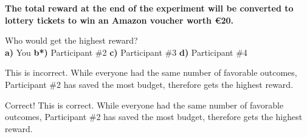 \textbf{The total reward at the end of the experiment will be converted to lottery tickets to win an Amazon  voucher worth €20.}

\begin{table}[H]
    \centering
    \label{tab:q10}
\end{table}

Who would get the highest reward? \\
\indent \textbf{a)} You \indent \indent \textbf{b*)} Participant \#2
\indent \indent \textbf{c)} Participant \#3
\indent \indent \textbf{d)} Participant \#4

 This is incorrect. While everyone had the same number of favorable outcomes, Participant \#2 has saved the most budget, therefore gets the highest reward.

 Correct! This is correct. While everyone had the same number of favorable outcomes, Participant \#2 has saved the most budget, therefore gets the highest reward.

